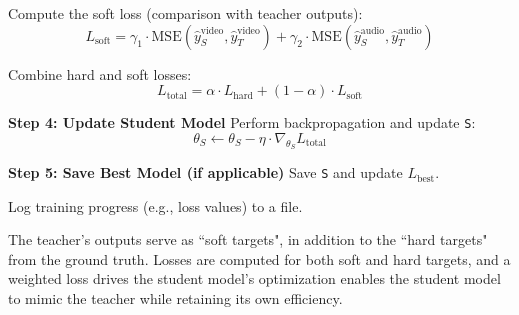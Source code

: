 \begin{algorithm}[ht!]
\begin{algorithmic}[1]
            \STATE Compute the soft loss (comparison with teacher outputs):
            \[
            L_\text{soft} = \gamma_1 \cdot \text{MSE}(\hat{y}_S^\text{video}, \hat{y}_T^\text{video}) +
                            \gamma_2 \cdot \text{MSE}(\hat{y}_S^\text{audio}, \hat{y}_T^\text{audio})
            \]

            \STATE Combine hard and soft losses:
            \[
            L_\text{total} = \alpha \cdot L_\text{hard} + (1 - \alpha) \cdot L_\text{soft}
            \]
    
            \STATE \textbf{Step 4: Update Student Model}
            \STATE Perform backpropagation and update \texttt{S}:
            \[
            \theta_S \gets \theta_S - \eta \cdot \nabla_{\theta_S} L_\text{total}
            \]
    
            \STATE \textbf{Step 5: Save Best Model (if applicable)}
                \STATE Save \texttt{S} and update \texttt{$L_\text{best}$}.
            \ENDIF
    
            \STATE Log training progress (e.g., loss values) to a file.
        \ENDFOR
    \end{algorithmic}
\end{algorithm}
The teacher's outputs serve as ``soft targets", in addition to the ``hard targets" from the ground truth. Losses are computed for both soft and hard targets, and a weighted loss drives the student model's optimization enables the student model to mimic the teacher while retaining its own efficiency.

\pagebreak 
